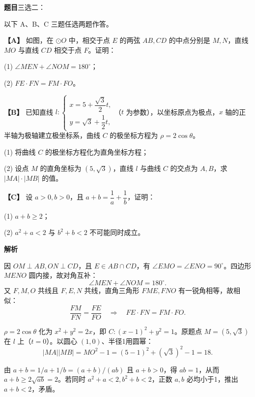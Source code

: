 \begin{answer}

\textbf{题目}三选二：

以下 A、B、C 三题任选两题作答。

\textbf{【A】} 如图，在 \(\odot O\) 中，相交于点 \(E\) 的两弦 \(AB,CD\) 的中点分别是 \(M,N\)，直线 \(MO\) 与直线 \(CD\) 相交于点 \(F\)。证明：
\nopagebreak[4]
\begin{center}\end{center}
\nopagebreak[4]
(1) \(\angle MEN+\angle NOM=180^\circ\)；

(2) \(FE\cdot FN=FM\cdot FO\)。

\textbf{【B】} 已知直线 \(l:\begin{cases}x=5+\dfrac{\sqrt3}{2}t,\\y=\sqrt3+\dfrac12t,\end{cases}\)（\(t\) 为参数），以坐标原点为极点，\(x\) 轴的正半轴为极轴建立极坐标系，曲线 \(C\) 的极坐标方程为 \(\rho=2\cos\theta\)。

(1) 将曲线 \(C\) 的极坐标方程化为直角坐标方程；

(2) 设点 \(M\) 的直角坐标为 \((5,\sqrt3)\)，直线 \(l\) 与曲线 \(C\) 的交点为 \(A,B\)，求 \(\lvert MA\rvert\cdot\lvert MB\rvert\) 的值。

\textbf{【C】} 设 \(a>0,b>0\)，且 \(a+b=\dfrac1a+\dfrac1b\)，证明：

(1) \(a+b\geqslant2\)；

(2) \(a^2+a<2\) 与 \(b^2+b<2\) 不可能同时成立。

\textbf{解析}

因 \(OM\perp AB,ON\perp CD\)，且 \(E\in AB\cap CD\)，有 \(\angle EMO=\angle ENO=90^\circ\)。四边形 \(MENO\) 圆内接，故对角互补：
\nopagebreak[4]
\[
\angle MEN+\angle NOM=180^\circ.
\]
又 \(F,M,O\) 共线且 \(F,E,N\) 共线，直角三角形 \(FME,FNO\) 有一锐角相等，故相似：
\nopagebreak[4]
\[
\frac{FM}{FN}=\frac{FE}{FO}
\quad\Longrightarrow\quad FE\cdot FN=FM\cdot FO.
\]

\(\rho=2\cos\theta\) 化为 \(x^2+y^2=2x\)，即 \(C:(x-1)^2+y^2=1\)。原题点 \(M=(5,\sqrt3)\) 在 \(l\) 上（\(t=0\)）。以圆心 \((1,0)\)、半径1用圆幂：
\nopagebreak[4]
\[
|MA||MB|=MO^2-1=(5-1)^2+(\sqrt3)^2-1=18.
\]

由 \(a+b=1/a+1/b=(a+b)/(ab)\) 且 \(a+b>0\)，得 \(ab=1\)，从而 \(a+b\ge2\sqrt{ab}=2\)。若同时 \(a^2+a<2,b^2+b<2\)，正数 \(a,b\) 必均小于1，推出 \(a+b<2\)，矛盾。



\end{answer}
